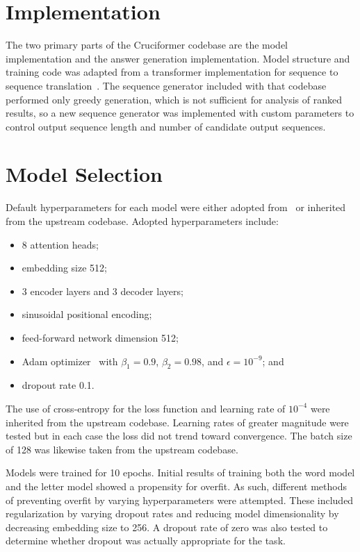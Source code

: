 \documentclass[letterpaper]{article} %
\begin{document}
\begin{NoHyper}
\section{Implementation}
\label{sec:impl}

The two primary parts of the Cruciformer codebase are the model implementation and the answer generation implementation. Model structure and training code was adapted from a transformer implementation for sequence to sequence translation~\cite{chegde2022}. The sequence generator included with that codebase performed only greedy generation, which is not sufficient for analysis of ranked results, so a new sequence generator was implemented with custom parameters to control output sequence length and number of candidate output sequences.

\section{Model Selection}
\label{sec:model}

Default hyperparameters for each model were either adopted from~\citealp{vaswani2017} or inherited from the upstream codebase.
Adopted hyperparameters include:

\begin{itemize}
\item 8 attention heads;
\item embedding size 512;
\item 3 encoder layers and 3 decoder layers;
\item sinusoidal positional encoding;
\item feed-forward network dimension 512;
\item Adam optimizer~\cite{kingma2017adam} with $\beta_1 = 0.9$, $\beta_2 = 0.98$, and $\epsilon = 10^{-9}$; and
\item dropout rate 0.1.
\end{itemize}

The use of cross-entropy for the loss function and learning rate of $10^{-4}$ were inherited from the upstream codebase.
Learning rates of greater magnitude were tested but in each case the loss did not trend toward convergence.
The batch size of 128 was likewise taken from the upstream codebase.

Models were trained for 10 epochs.
Initial results of training both the word model and the letter model showed a propensity for overfit.
As such, different methods of preventing overfit by varying hyperparameters were attempted.
These included regularization by varying dropout rates and reducing model dimensionality by decreasing embedding size to 256.
A dropout rate of zero was also tested to determine whether dropout was actually appropriate for the task.


\end{NoHyper}
\end{document}

